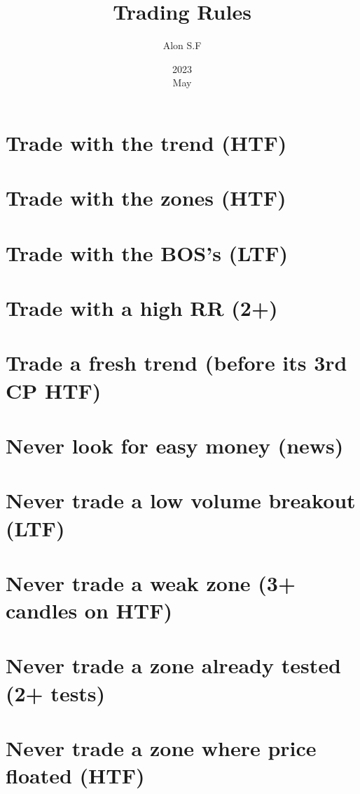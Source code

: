 \documentclass{article}%
\title{Trading Rules}
\date{2023\\ May}
\author{Alon S.F}
\begin{document}
\maketitle
\section{Trade with the trend (HTF)}
\section{Trade with the zones (HTF)}
\section{Trade with the BOS's (LTF)}
\section{Trade with a high RR (2+)}
\section{Trade a fresh trend (before its 3rd CP HTF)}
\section{Never look for easy money (news)}
\section{Never trade a low volume breakout (LTF)}
\section{Never trade a weak zone (3+ candles on HTF)}
\section{Never trade a zone already tested (2+ tests)}
\section{Never trade a zone where price floated (HTF)}
\end{document}
